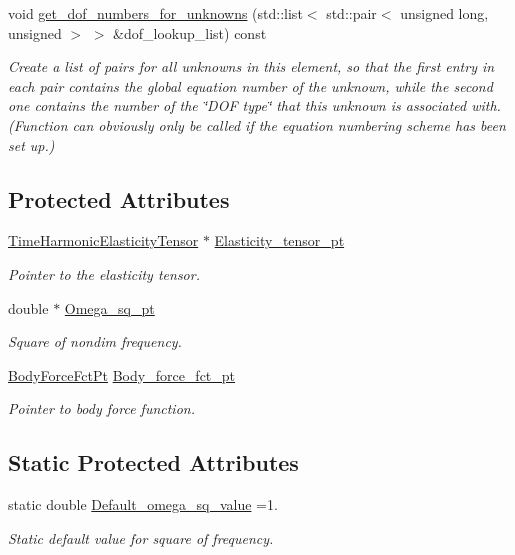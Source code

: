 \begin{DoxyCompactItemize}
void \hyperlink{classoomph_1_1TimeHarmonicLinearElasticityEquationsBase_ac74f1b42228e68d61ebe3d20cc8ba001}{get\+\_\+dof\+\_\+numbers\+\_\+for\+\_\+unknowns} (std\+::list$<$ std\+::pair$<$ unsigned long, unsigned $>$ $>$ \&dof\+\_\+lookup\+\_\+list) const
\begin{DoxyCompactList}\small\item\em Create a list of pairs for all unknowns in this element, so that the first entry in each pair contains the global equation number of the unknown, while the second one contains the number of the \char`\"{}\+D\+O\+F type\char`\"{} that this unknown is associated with. (Function can obviously only be called if the equation numbering scheme has been set up.) \end{DoxyCompactList}\end{DoxyCompactItemize}
\subsection*{Protected Attributes}
\begin{DoxyCompactItemize}
\item 
\hyperlink{classoomph_1_1TimeHarmonicElasticityTensor}{Time\+Harmonic\+Elasticity\+Tensor} $\ast$ \hyperlink{classoomph_1_1TimeHarmonicLinearElasticityEquationsBase_a654ac9241cca62bea65d5a3dd19d136d}{Elasticity\+\_\+tensor\+\_\+pt}
\begin{DoxyCompactList}\small\item\em Pointer to the elasticity tensor. \end{DoxyCompactList}\item 
double $\ast$ \hyperlink{classoomph_1_1TimeHarmonicLinearElasticityEquationsBase_a0d9d2b717af2ef592334f23875297d69}{Omega\+\_\+sq\+\_\+pt}
\begin{DoxyCompactList}\small\item\em Square of nondim frequency. \end{DoxyCompactList}\item 
\hyperlink{classoomph_1_1TimeHarmonicLinearElasticityEquationsBase_a8cff2941bd4dc9fd3714c151cf5b6e33}{Body\+Force\+Fct\+Pt} \hyperlink{classoomph_1_1TimeHarmonicLinearElasticityEquationsBase_a9d956cbcc0fbc643a344e206df08c3fe}{Body\+\_\+force\+\_\+fct\+\_\+pt}
\begin{DoxyCompactList}\small\item\em Pointer to body force function. \end{DoxyCompactList}\end{DoxyCompactItemize}
\subsection*{Static Protected Attributes}
\begin{DoxyCompactItemize}
\item 
static double \hyperlink{classoomph_1_1TimeHarmonicLinearElasticityEquationsBase_a7c3b5bb45b05625e2ed2a046e319c6f8}{Default\+\_\+omega\+\_\+sq\+\_\+value} =1.
\begin{DoxyCompactList}\small\item\em Static default value for square of frequency. \end{DoxyCompactList}\end{DoxyCompactItemize}
